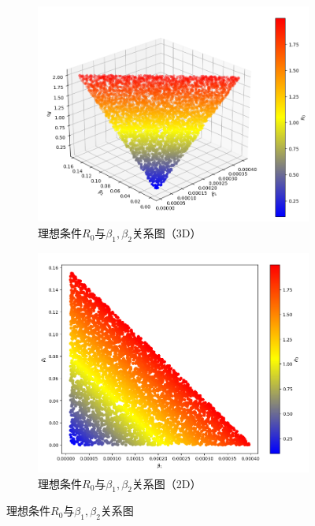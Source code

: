 \documentclass{ctexart}
\begin{document}
    \begin{figure}[H]
        \centering
        \begin{subfigure}[b]{0.48\linewidth}
            \includegraphics[width=\linewidth]{3.1.1.png}
            \caption{理想条件$R_{0}$与$\beta_{1},\beta_{2}$关系图（3D）}
            \label{fig.3.1.1}
        \end{subfigure}
        \begin{subfigure}[b]{0.48\linewidth}
            \includegraphics[width=\linewidth]{3.1.2.png}
            \caption{理想条件$R_{0}$与$\beta_{1},\beta_{2}$关系图（2D）}
            \label{fig.3.1.2}
        \end{subfigure}
        \caption{理想条件$R_{0}$与$\beta_{1},\beta_{2}$关系图}
        \label{fig.3.1.1-2}
    \end{figure}
\end{document}
